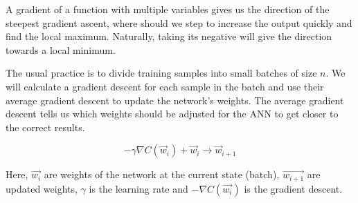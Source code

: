 A gradient of a function with multiple variables gives us the direction of the steepest gradient ascent, where should we step to increase the output quickly and find the local maximum. Naturally, taking its negative will give the direction towards a local minimum. 

The usual practice is to divide training samples into small batches of size $n$. We will calculate a gradient descent for each sample in the batch and use their average gradient descent to update the network's weights. The average gradient descent tells us which weights should be adjusted for the ANN to get closer to the correct results.\cite{birlliantbackprop}

\begin{equation}
    {- \gamma \nabla C(\vec{w}_i) + \vec{w}_i \rightarrow \vec{w}_{i+1} }
\end{equation}

Here, $\vec{w_i}$ are weights of the network at the current state (batch), $\vec{w_{i+1}}$ are updated weights, $\gamma$ is the learning rate and $-\nabla C(\vec{w_i})$ is the gradient descent.
